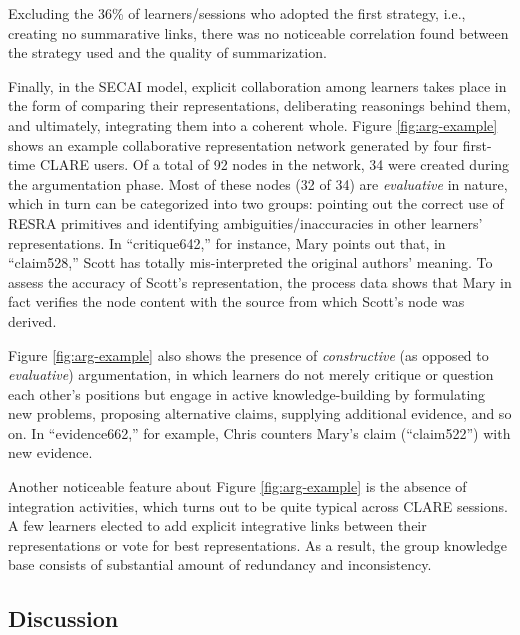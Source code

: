 Excluding the 36\% of learners/sessions who adopted the first
strategy, i.e., creating no summarative links, there was no noticeable
correlation found between the strategy used and the quality of
summarization.

Finally, in the SECAI model, explicit collaboration among learners takes
place in the form of comparing their representations, deliberating
reasonings behind them, and ultimately, integrating them into a coherent
whole. Figure \ref{fig:arg-example} shows an example collaborative
representation network generated by four first-time CLARE users. Of a total
of 92 nodes in the network, 34 were created during the argumentation phase.
Most of these nodes (32 of 34) are {\it evaluative \/} in nature, which in
turn can be categorized into two groups: pointing out the correct use of
RESRA primitives and identifying ambiguities/inaccuracies in other
learners' representations. In ``critique642,'' for instance, Mary points
out that, in ``claim528,'' Scott has totally mis-interpreted the original
authors' meaning. To assess the accuracy of Scott's representation, the
process data shows that Mary in fact verifies the node content with the
source from which Scott's node was derived.

Figure \ref{fig:arg-example} also shows the presence of {\it
constructive\/} (as opposed to {\it evaluative\/}) argumentation, in which
learners do not merely critique or question each other's positions but
engage in active knowledge-building by formulating new problems, proposing
alternative claims, supplying additional evidence, and so on. In
``evidence662,'' for example, Chris counters Mary's claim (``claim522'')
with new evidence.

Another noticeable feature about Figure \ref{fig:arg-example} is the
absence of integration activities, which turns out to be quite typical
across CLARE sessions. A few learners elected to add explicit integrative
links between their representations or vote for best representations. As a
result, the group knowledge base consists of substantial amount of
redundancy and inconsistency.

\begin{figure*}[hbtp]
 \centerline{}
  \label{fig:arg-example}
\end{figure*}


\subsection{Discussion}
\label{sec:discussion}

